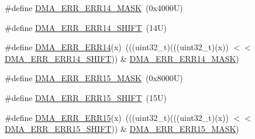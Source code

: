\begin{DoxyCompactItemize}
\item 
\#define \mbox{\hyperlink{group___d_m_a___register___masks_ga75221d150ac8723e86b606a11d0afa4b}{D\+M\+A\+\_\+\+E\+R\+R\+\_\+\+E\+R\+R14\+\_\+\+M\+A\+SK}}~(0x4000\+U)
\item 
\#define \mbox{\hyperlink{group___d_m_a___register___masks_ga007cfb975ad771415fc6ff30ec5e0ff8}{D\+M\+A\+\_\+\+E\+R\+R\+\_\+\+E\+R\+R14\+\_\+\+S\+H\+I\+FT}}~(14\+U)
\item 
\#define \mbox{\hyperlink{group___d_m_a___register___masks_ga50f9243ae8a01f9bfabb50ff17a5bf07}{D\+M\+A\+\_\+\+E\+R\+R\+\_\+\+E\+R\+R14}}(x)~(((uint32\+\_\+t)(((uint32\+\_\+t)(x)) $<$$<$ \mbox{\hyperlink{group___d_m_a___register___masks_ga007cfb975ad771415fc6ff30ec5e0ff8}{D\+M\+A\+\_\+\+E\+R\+R\+\_\+\+E\+R\+R14\+\_\+\+S\+H\+I\+FT}})) \& \mbox{\hyperlink{group___d_m_a___register___masks_ga75221d150ac8723e86b606a11d0afa4b}{D\+M\+A\+\_\+\+E\+R\+R\+\_\+\+E\+R\+R14\+\_\+\+M\+A\+SK}})
\item 
\#define \mbox{\hyperlink{group___d_m_a___register___masks_gaa3b260afe4db53c9e602f1f6a5201fff}{D\+M\+A\+\_\+\+E\+R\+R\+\_\+\+E\+R\+R15\+\_\+\+M\+A\+SK}}~(0x8000\+U)
\item 
\#define \mbox{\hyperlink{group___d_m_a___register___masks_ga2045ddbd1bc78466e6fa9b2ac4202ef1}{D\+M\+A\+\_\+\+E\+R\+R\+\_\+\+E\+R\+R15\+\_\+\+S\+H\+I\+FT}}~(15\+U)
\item 
\#define \mbox{\hyperlink{group___d_m_a___register___masks_ga3b9b9856ad9859c86375ac2d6ede7e25}{D\+M\+A\+\_\+\+E\+R\+R\+\_\+\+E\+R\+R15}}(x)~(((uint32\+\_\+t)(((uint32\+\_\+t)(x)) $<$$<$ \mbox{\hyperlink{group___d_m_a___register___masks_ga2045ddbd1bc78466e6fa9b2ac4202ef1}{D\+M\+A\+\_\+\+E\+R\+R\+\_\+\+E\+R\+R15\+\_\+\+S\+H\+I\+FT}})) \& \mbox{\hyperlink{group___d_m_a___register___masks_gaa3b260afe4db53c9e602f1f6a5201fff}{D\+M\+A\+\_\+\+E\+R\+R\+\_\+\+E\+R\+R15\+\_\+\+M\+A\+SK}})
\end{DoxyCompactItemize}
